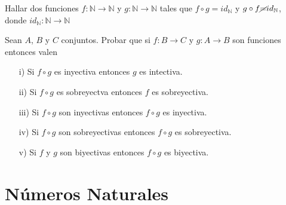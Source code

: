 \documentclass[10pt]{article}
\begin{document}
\begin{ej}
Hallar dos funciones $f: \mathbb{N} \rightarrow \mathbb{N}$ y $g: \mathbb{N} \rightarrow \mathbb{N}$ tales que $f \circ g = id_{\mathbb{N}}$ y $g \circ f \cancel{=} id_{\mathbb{N}}$, donde $id_{\mathbb{N}}: \mathbb{N} \rightarrow \mathbb{N}$
\end{ej}

\begin{ej}
Sean $A$, $B$ y $C$ conjuntos. Probar que si $f: B \rightarrow C$ y $g: A \rightarrow B$ son funciones entonces valen
\begin{itemize}
	\item[i)] Si $f \circ g$ es inyectiva entonces $g$ es intectiva.
	\item[ii)] Si $f \circ g$ es sobreyectva entonces $f$ es sobreyectiva.
	\item[iii)] Si $f \circ g$ son inyectivas entonces $f \circ g$ es inyectiva. 
	\item[iv)] Si $f \circ g$ son sobreyectivas entonces $f \circ g$ es sobreyectiva.
	\item[v)] Si $f$ y $g$ son biyectivas entonces $f \circ g$ es biyectiva.
\end{itemize}
\end{ej}
\newpage
\section{Números Naturales}
\end{document}
